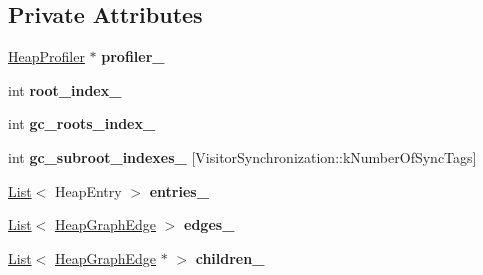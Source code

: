 \subsection*{Private Attributes}
\begin{DoxyCompactItemize}
\item 
\hyperlink{classv8_1_1internal_1_1_heap_profiler}{Heap\+Profiler} $\ast$ {\bfseries profiler\+\_\+}\hypertarget{classv8_1_1internal_1_1_heap_snapshot_a57e194743619363a6a32946745513934}{}\label{classv8_1_1internal_1_1_heap_snapshot_a57e194743619363a6a32946745513934}

\item 
int {\bfseries root\+\_\+index\+\_\+}\hypertarget{classv8_1_1internal_1_1_heap_snapshot_a9af2ad57fbf701db2274712faf3e50d6}{}\label{classv8_1_1internal_1_1_heap_snapshot_a9af2ad57fbf701db2274712faf3e50d6}

\item 
int {\bfseries gc\+\_\+roots\+\_\+index\+\_\+}\hypertarget{classv8_1_1internal_1_1_heap_snapshot_a05c10bf83ea962ce0df4a9a7aa28eb23}{}\label{classv8_1_1internal_1_1_heap_snapshot_a05c10bf83ea962ce0df4a9a7aa28eb23}

\item 
int {\bfseries gc\+\_\+subroot\+\_\+indexes\+\_\+} \mbox{[}Visitor\+Synchronization\+::k\+Number\+Of\+Sync\+Tags\mbox{]}\hypertarget{classv8_1_1internal_1_1_heap_snapshot_a247f6626117b71c23e6bf3c068dc980d}{}\label{classv8_1_1internal_1_1_heap_snapshot_a247f6626117b71c23e6bf3c068dc980d}

\item 
\hyperlink{classv8_1_1internal_1_1_list}{List}$<$ Heap\+Entry $>$ {\bfseries entries\+\_\+}\hypertarget{classv8_1_1internal_1_1_heap_snapshot_acbc505f0f5e88a264f01d6cca3566c11}{}\label{classv8_1_1internal_1_1_heap_snapshot_acbc505f0f5e88a264f01d6cca3566c11}

\item 
\hyperlink{classv8_1_1internal_1_1_list}{List}$<$ \hyperlink{classv8_1_1_heap_graph_edge}{Heap\+Graph\+Edge} $>$ {\bfseries edges\+\_\+}\hypertarget{classv8_1_1internal_1_1_heap_snapshot_abec70ba13fb203c82afca8dc2d457e88}{}\label{classv8_1_1internal_1_1_heap_snapshot_abec70ba13fb203c82afca8dc2d457e88}

\item 
\hyperlink{classv8_1_1internal_1_1_list}{List}$<$ \hyperlink{classv8_1_1_heap_graph_edge}{Heap\+Graph\+Edge} $\ast$ $>$ {\bfseries children\+\_\+}\hypertarget{classv8_1_1internal_1_1_heap_snapshot_a00df16e2922d70d952941df77858fa24}{}\label{classv8_1_1internal_1_1_heap_snapshot_a00df16e2922d70d952941df77858fa24}


\end{DoxyCompactItemize}
